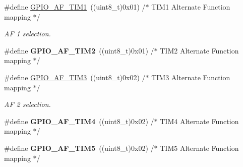 \begin{DoxyCompactItemize}
\item 
\mbox{\label{group___g_p_i_o___alternat__function__selection__define_ga9a65573a3d8684febe1fda5c6cd8c992}} 
\#define \hyperlink{group___g_p_i_o___alternat__function__selection__define_ga9a65573a3d8684febe1fda5c6cd8c992}{G\+P\+I\+O\+\_\+\+A\+F\+\_\+\+T\+I\+M1}~((uint8\+\_\+t)0x01)  /$\ast$ T\+I\+M1 Alternate Function mapping $\ast$/
\begin{DoxyCompactList}\small\item\em AF 1 selection. \end{DoxyCompactList}\item 
\mbox{\label{group___g_p_i_o___alternat__function__selection__define_ga6a1335e47fe67ff5a08ebe0ebfec2ffa}} 
\#define {\bfseries G\+P\+I\+O\+\_\+\+A\+F\+\_\+\+T\+I\+M2}~((uint8\+\_\+t)0x01)  /$\ast$ T\+I\+M2 Alternate Function mapping $\ast$/
\item 
\mbox{\label{group___g_p_i_o___alternat__function__selection__define_ga8c6bda0c56abc29eef7709b52d9d3e0d}} 
\#define \hyperlink{group___g_p_i_o___alternat__function__selection__define_ga8c6bda0c56abc29eef7709b52d9d3e0d}{G\+P\+I\+O\+\_\+\+A\+F\+\_\+\+T\+I\+M3}~((uint8\+\_\+t)0x02)  /$\ast$ T\+I\+M3 Alternate Function mapping $\ast$/
\begin{DoxyCompactList}\small\item\em AF 2 selection. \end{DoxyCompactList}\item 
\mbox{\label{group___g_p_i_o___alternat__function__selection__define_gabe02d26327e89fe4c9aaf30ec1187009}} 
\#define {\bfseries G\+P\+I\+O\+\_\+\+A\+F\+\_\+\+T\+I\+M4}~((uint8\+\_\+t)0x02)  /$\ast$ T\+I\+M4 Alternate Function mapping $\ast$/
\item 
\mbox{\label{group___g_p_i_o___alternat__function__selection__define_gad1abee116e98620ade37334e649e6006}} 
\#define {\bfseries G\+P\+I\+O\+\_\+\+A\+F\+\_\+\+T\+I\+M5}~((uint8\+\_\+t)0x02)  /$\ast$ T\+I\+M5 Alternate Function mapping $\ast$/
\item 
\mbox{\label{group___g_p_i_o___alternat__function__selection__define_gaf7562d5cf5d33dbc7b7c69df63182583}} 

\end{DoxyCompactItemize}
